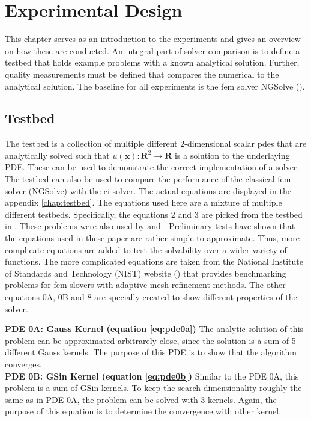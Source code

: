 \documentclass[./\jobname.tex]{subfiles}
\begin{document}
\chapter{Experimental Design}
This chapter serves as an introduction to the experiments and gives an overview on how these are conducted. An integral part of solver comparison is to define a testbed that holds example problems with a known analytical solution. Further, quality measurements must be defined that compares the numerical to the analytical solution. The baseline for all experiments is the \gls{fem} solver NGSolve (\cite{mitchell_nist_2018}).

\section{Testbed}
The testbed is a collection of multiple different 2-dimensional scalar \gls{pde}s that are analytically solved such that $u(\mathbf{x}): \mathbf{R}^2 \rightarrow \mathbf{R}$ is a solution to the underlaying PDE. These can be used to demonstrate the correct implementation of a solver. The testbed can also be used to compare the performance of the classical \gls{fem} solver (NGSolve) with the \gls{ci} solver. The actual equations are displayed in the appendix \ref{chap:testbed}. The equations used here are a mixture of multiple different testbeds. Specifically, the equations 2 and 3 are picked from the testbed in \cite{chaquet_using_2019}. These problems were also used by \cite{tsoulos_solving_2006} and \cite{panagant_solving_2014}. Preliminary tests have shown that the equations used in these paper are rather simple to approximate. Thus, more complicate equations are added to test the solvability over a wider variety of functions. The more complicated equations are taken from the National Institute of Standards and Technology (NIST) website (\cite{mitchell_nist_2018}) that provides benchmarking problems for \gls{fem} slovers with adaptive mesh refinement methods. The other equations 0A, 0B and 8 are specially created to show different properties of the solver. 

\textbf{PDE 0A: Gauss Kernel (equation \ref{eq:pde0a})} The analytic solution of this problem can be approximated arbitrarely close, since the solution is a sum of 5 different Gauss kernels.  The purpose of this PDE is to show that the algorithm converges. \\

\textbf{PDE 0B: GSin Kernel (equation \ref{eq:pde0b})} Similar to the PDE 0A, this problem is a sum of GSin kernels. To keep the search dimensionality roughly the same as in PDE 0A, the problem can be solved with 3 kernels.  Again, the purpose of this equation is to determine the convergence with other kernel.  \\
\end{document}
